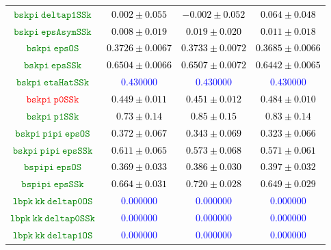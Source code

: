 \documentclass[10pt,a4paper]{article}
\begin{document}
\begin{table}[h!]
{\begin{tabular}{cccc}
\textcolor{Green}{$\mathtt{bskpi~deltap1SSk~}$} & \textcolor{black}{$0.002 \pm 0.055$}& \textcolor{black}{$-0.002 \pm 0.052$}& \textcolor{black}{$0.064 \pm 0.048$}\\
\textcolor{Green}{$\mathtt{bskpi~epsAsymSSk~}$} & \textcolor{black}{$0.008 \pm 0.019$}& \textcolor{black}{$0.019 \pm 0.020$}& \textcolor{black}{$0.011 \pm 0.018$}\\
\textcolor{Green}{$\mathtt{bskpi~epsOS~}$} & \textcolor{black}{$0.3726 \pm 0.0067$}& \textcolor{black}{$0.3733 \pm 0.0072$}& \textcolor{black}{$0.3685 \pm 0.0066$}\\
\textcolor{Green}{$\mathtt{bskpi~epsSSk~}$} & \textcolor{black}{$0.6504 \pm 0.0066$}& \textcolor{black}{$0.6507 \pm 0.0072$}& \textcolor{black}{$0.6442 \pm 0.0065$}\\
\textcolor{Green}{$\mathtt{bskpi~etaHatSSk~}$} & \textcolor{blue}{$0.430000$}& \textcolor{blue}{$0.430000$}& \textcolor{blue}{$0.430000$}\\
\textcolor{red}{$\mathtt{bskpi~p0SSk~}$} & \textcolor{black}{$0.449 \pm 0.011$}& \textcolor{black}{$0.451 \pm 0.012$}& \textcolor{black}{$0.484 \pm 0.010$}\\
\textcolor{Green}{$\mathtt{bskpi~p1SSk~}$} & \textcolor{black}{$0.73 \pm 0.14$}& \textcolor{black}{$0.85 \pm 0.15$}& \textcolor{black}{$0.83 \pm 0.14$}\\
\textcolor{Green}{$\mathtt{bskpi~pipi~epsOS~}$} & \textcolor{black}{$0.372 \pm 0.067$}& \textcolor{black}{$0.343 \pm 0.069$}& \textcolor{black}{$0.323 \pm 0.066$}\\
\textcolor{Green}{$\mathtt{bskpi~pipi~epsSSk~}$} & \textcolor{black}{$0.611 \pm 0.065$}& \textcolor{black}{$0.573 \pm 0.068$}& \textcolor{black}{$0.571 \pm 0.061$}\\
\textcolor{Green}{$\mathtt{bspipi~epsOS~}$} & \textcolor{black}{$0.369 \pm 0.033$}& \textcolor{black}{$0.386 \pm 0.030$}& \textcolor{black}{$0.397 \pm 0.032$}\\
\textcolor{Green}{$\mathtt{bspipi~epsSSk~}$} & \textcolor{black}{$0.664 \pm 0.031$}& \textcolor{black}{$0.720 \pm 0.028$}& \textcolor{black}{$0.649 \pm 0.029$}\\
\textcolor{Green}{$\mathtt{lbpk~kk~deltap0OS~}$} & \textcolor{blue}{$0.000000$}& \textcolor{blue}{$0.000000$}& \textcolor{blue}{$0.000000$}\\
\textcolor{Green}{$\mathtt{lbpk~kk~deltap0SSk~}$} & \textcolor{blue}{$0.000000$}& \textcolor{blue}{$0.000000$}& \textcolor{blue}{$0.000000$}\\
\textcolor{Green}{$\mathtt{lbpk~kk~deltap1OS~}$} & \textcolor{blue}{$0.000000$}& \textcolor{blue}{$0.000000$}& \textcolor{blue}{$0.000000$}\\

\end{tabular}}
\end{table}
\end{document}

